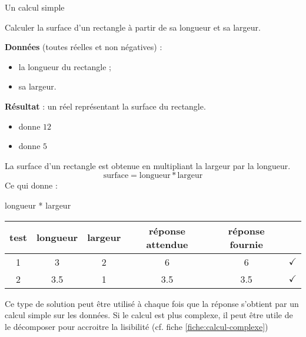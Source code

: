 \begin{Fiche}{Un calcul simple}
\label{fiche:calcul-simple}

Calculer la surface d'un rectangle à partir de sa longueur et sa largeur.
	

	\textbf{Données} (toutes réelles et non négatives) :
		\begin{itemize}
			\item la longueur du rectangle ;
			\item sa largeur.
		\end{itemize}
		
	\textbf{Résultat} : un réel représentant la surface du rectangle.

	\begin{center}	
	\end{center}


	\begin{itemize}
	\item {} donne $12$
	\item {} donne $5$
	\end{itemize}


	La surface d'un rectangle est obtenue en multipliant
	la largeur par la longueur.
	\[
		\textrm{surface} = \textrm{longueur} * \textrm{largeur}
	\]
	Ce qui donne :

	\begin{LDA}
			\Return longueur * largeur
		\EndAlgo
	\end{LDA}


	\begin{center}
		\begin{tabular}{|c|cccc|c|}
		\hline
		test \no & longueur & largeur & réponse attendue & réponse fournie & {} \\\hline
		\hline 
		1 & 3   & 2 & 6   & 6   & {\color{ForestGreen}$\checkmark$} \\\hline
		2 & 3.5 & 1 & 3.5 & 3.5 & {\color{ForestGreen}$\checkmark$} \\\hline
		\end{tabular}
	\end{center}				


	Ce type de solution peut être utilisé à chaque fois
	que la réponse s'obtient par un calcul simple sur les données.
	Si le calcul est plus complexe, 
	il peut être utile de le décomposer pour accroitre la lisibilité
	(cf. fiche \vref{fiche:calcul-complexe}) 
	
\end{Fiche}
